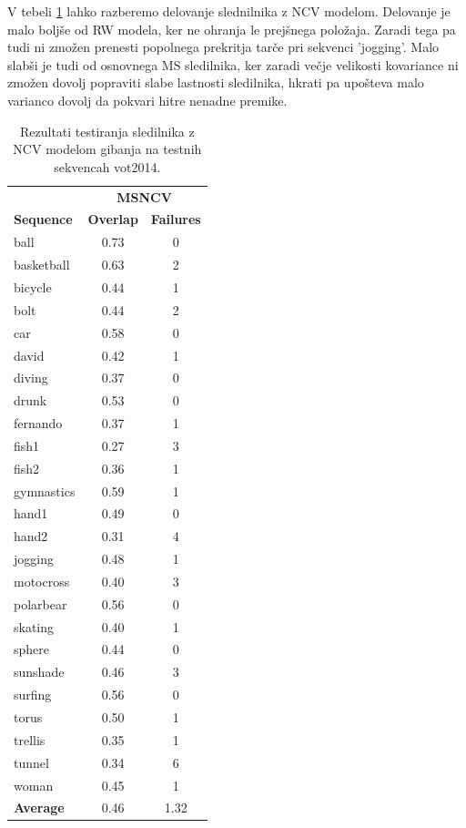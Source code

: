 \documentclass[a4paper]{article}
\begin{document}
V tebeli \ref{tabelarncv} lahko razberemo delovanje slednilnika z NCV modelom. Delovanje je malo boljše od RW modela, ker ne ohranja le prejšnega položaja. Zaradi tega pa tudi ni zmožen prenesti popolnega prekritja tarče pri sekvenci 'jogging'. Malo slabši je tudi od osnovnega MS sledilnika, ker zaradi večje velikosti kovariance ni zmožen dovolj popraviti slabe lastnosti sledilnika, hkrati pa upošteva malo varianco dovolj da pokvari hitre nenadne premike. 

\begin{table}[h!]
	\begin{center}
		\begin{tabular}{l c c}
			\hline 
			& \multicolumn{2}{c}{{\bf MSNCV}}\\
			{\bf Sequence} & {\bf Overlap} & {\bf Failures} \\
			\hline 
			ball & 0.73 & 0\\
			basketball & 0.63 & 2\\
			bicycle & 0.44 & 1\\
			bolt & 0.44 & 2\\
			car & 0.58 & 0\\
			david & 0.42 & 1\\
			diving & 0.37 & 0\\
			drunk & 0.53 & 0\\
			fernando & 0.37 & 1\\
			fish1 & 0.27 & 3\\
			fish2 & 0.36 & 1\\
			gymnastics & 0.59 & 1\\
			hand1 & 0.49 & 0\\
			hand2 & 0.31 & 4\\
			jogging & 0.48 & 1\\
			motocross & 0.40 & 3\\
			polarbear & 0.56 & 0\\
			skating & 0.40 & 1\\
			sphere & 0.44 & 0\\
			sunshade & 0.46 & 3\\
			surfing & 0.56 & 0\\
			torus & 0.50 & 1\\
			trellis & 0.35 & 1\\
			tunnel & 0.34 & 6\\
			woman & 0.45 & 1\\
			\hline 
			{\bf Average} & 0.46 & 1.32\\
			\hline 
		\end{tabular}
	\end{center}
	\caption{Rezultati testiranja sledilnika z NCV modelom gibanja na testnih sekvencah vot2014.}
	\label{tabelarncv}
\end{table}
\end{document}
